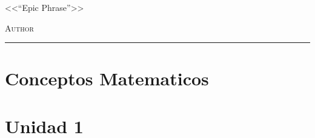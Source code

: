 \documentclass[12pt,a4paper]{book}
\begin{document}
\renewcommand{\contentsname}{\vspace{0cm} Contenido \vspace{-2cm}}

\begin{titlepage}
\vspace*{2cm}

\noindent
\vspace*{0.5cm}

\vspace{1.5cm}
\epigraph{<<``Epic Phrase''>>}%
{ \textsc{Author}}
\null\vfill
\vspace*{1cm}
\noindent
\hfill
\begin{minipage}{0.7\linewidth}
    \begin{flushright}
        \printauthor %
    \end{flushright}
\end{minipage}
%
\begin{minipage}{0.02\linewidth}
    \rule{1pt}{70pt}
\end{minipage}
\titlepagedecoration
\end{titlepage}

\let\cleardoublepage=\clearpage
\tableofcontents
\blankpage

\chapter{Conceptos Matematicos}

\newpage\thispagestyle{empty}\blankpage
\chapter{Unidad 1}



\blankpage


\nocite{*}
\end{document}

